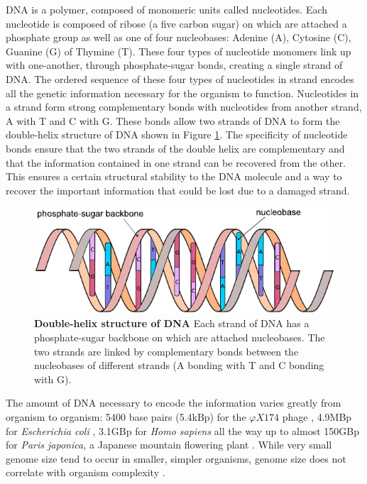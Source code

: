 \documentclass[
  11pt,
  twoside]{scrbook}
\newcommand{\extcaption}[2]{
    \caption[#1]{
        \textbf{#1}\newline
        #2
    }
}
\begin{document}
DNA is a polymer, composed of monomeric units called nucleotides. Each nucleotide is composed of ribose (a five carbon sugar) on which are attached a phosphate group as well as one of four nucleobases: Adenine (A), Cytosine (C), Guanine (G) of Thymine (T). These four types of nucleotide monomers link up with one-another, through phosphate-sugar bonds, creating a single strand of DNA. The ordered sequence of these four types of nucleotides in strand encodes all the genetic information necessary for the organism to function. Nucleotides in a strand form strong complementary bonds with nucleotides from another strand, A with T and C with G. These bonds allow two strands of DNA to form the double-helix structure of DNA \autocite{watson1953} shown in Figure \ref{fig:figDNA}. The specificity of nucleotide bonds ensure that the two strands of the double helix are complementary and that the information contained in one strand can be recovered from the other. This ensures a certain structural stability to the DNA molecule and a way to recover the important information that could be lost due to a damaged strand.

\begin{figure}[h]
\centering
\includegraphics[width=\linewidth]{./figures/Sequence-Intro/DNA.pdf}
\extcaption{Double-helix structure of DNA}{Each strand of DNA has a phosphate-sugar backbone on which are attached nucleobases. The two strands are linked by complementary bonds between the nucleobases of different strands (A bonding with T and C bonding with G).}
\label{fig:figDNA}
\end{figure}

The amount of DNA necessary to encode the information varies greatly from organism to organism: 5400 base pairs (5.4kBp) for the \(\varphi X174\) phage \autocite{sangerNucleotideSequenceBacteriophage1977}, 4.9MBp for \emph{Escherichia coli} \autocite{archer2011}, 3.1GBp for \emph{Homo sapiens} \autocite{nurk2022} all the way up to almost 150GBp for \emph{Paris japonica,} a Japanese mountain flowering plant \autocite{pellicer2010}. While very small genome size tend to occur in smaller, simpler organisms, genome size does not correlate with organism complexity \autocite{macgregor2001}.
\end{document}
